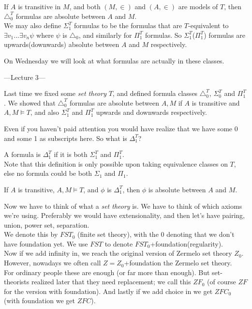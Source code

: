 \documentclass[a4paper]{article}
\begin{document}
\begin{coro}
If $A$ is transitive in $M$, and both $(M,\in)$ and $(A,\in)$ are models of $T$, then $\triangle_0^T$ formulas are absolute between $A$ and $M$.\\
We may also define $\Sigma_1^T$ formulas to be the formulas that are $T$-equivalent to $\exists v_1 ... \exists v_n \psi$ where $\psi$ is $\triangle_0$, and similarly for $\Pi_1^T$ formulas. So $\Sigma_1^T$($\Pi_1^T$) formulas are upwards(downwards) absolute between $A$ and $M$ respectively.
\end{coro}

On Wednesday we will look at what formulas are actually in these classes.

---Lecture 3---

Last time we fixed some \emph{set theory} $T$, and defined formula classes $\triangle_0^T$, $\Sigma_0^T$ and $\Pi_1^T$. We showed that $\triangle_0^T$ formulas are absolute between $A,M$ if $A$ is transitive and $A,M \vDash T$, and also $\Sigma_1^T$ and $\Pi_1^T$ upwards and downwards respectively.

Even if you haven't paid attention you would have realize that we have some 0 and some 1 as subscripts here. So what is $\Delta_1^T$?

\begin{defi}
A formula is $\Delta_1^T$ if it is both $\Sigma_1^T$ and $\Pi_1^T$.\\
Note that this definition is only possible upon taking equivalence classes on $T$, else no formula could be both $\Sigma_1$ and $\Pi_1$.
\end{defi}

\begin{coro}
If $A$ is transitive, $A,M \vDash T$, and $\phi$ is $\Delta_1^T$, then $\phi$ is absolute between $A$ and $M$.
\end{coro}

Now we have to think of what a \emph{set theory} is. We have to think of which axioms we're using. Preferably we would have extensionality, and then let's have pairing, union, power set, separation.\\
We denote this by $FST_0$ (finite set theory), with the $0$ denoting that we don't have foundation yet. We use $FST$ to denote $FST_0$+foundation(regularity).\\
Now if we add infinity in, we reach the original version of Zermelo set theory $Z_0$. However, nowadays we often call $Z=Z_0$+foundation the Zermelo set theory.\\
For ordinary people these are enough (or far more than enough). But set-theorists realized later that they need replacement; we call this $ZF_0$ (of course $ZF$ for the version with foundation). And lastly if we add choice in we get $ZFC_0$ (with foundation we get $ZFC$).
\end{document}
